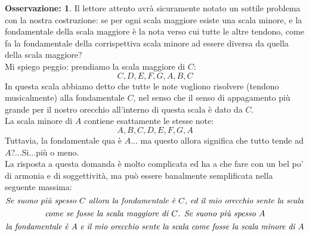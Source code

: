 \documentclass[12pt,a4paper]{book}
\theoremstyle{definition}
\theoremstyle{Theorem}
\theoremstyle{definition}
\theoremstyle{definition}
\theoremstyle{definition}
\newtheorem{Obs}[Def]{Osservazione:}
\begin{document}
	 		\begin{Obs}
	 			Il lettore attento avrà sicuramente notato un sottile problema con la nostra costruzione: se per ogni scala maggiore esiste una scala minore, e la fondamentale della scala maggiore è la nota verso cui tutte le altre tendono, come fa la fondamentale della corrispettiva scala minore ad essere diversa da quella della scala maggiore?\\
	 			Mi spiego peggio: prendiamo la scala maggiore di $C$:
	 			$$C,D,E,F,G,A,B,C$$
	 			In questa scala abbiamo detto che tutte le note vogliono risolvere (tendono musicalmente) alla fondamentale $C$, nel senso che il senso di appagamento più grande per il nostro orecchio all'interno di questa scala è dato da $C$.\\
	 			La scala minore di $A$ contiene esattamente le stesse note:
	 			$$A,B,C,D,E,F,G,A$$
	 			Tuttavia, la fondamentale qua è $A$... ma questo allora significa che tutto tende ad $A$?...Si...più o meno.\\
	 			La risposta a questa domanda è molto complicata ed ha a che fare con un bel po' di armonia e di soggettività, ma può essere banalmente semplificata nella seguente massima:
	 			$$\hbox{\textit{Se suono più spesso $C$ allora la fondamentale è $C$, ed il mio orecchio sente la scala}}$$ $$\hbox{\textit{come se fosse la scala maggiore di $C$. Se suono più spesso $A$}}$$
	 			$$\hbox{\textit{la fondamentale è $A$ e il mio orecchio sente la scala come fosse la scala minore di $A$}}$$
	 		\end{Obs}
\end{document}
